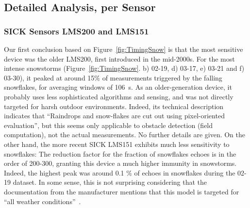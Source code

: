 \subsection{Detailed Analysis, per Sensor}

\subsubsection{SICK Sensors LMS200 and LMS151}
Our first conclusion based on Figure~\ref{fig:TimingSnow} is that the most sensitive device was the older LMS200, first introduced in the mid-2000s. For the most intense snowstorms (Figure~\ref{fig:TimingSnow}. b) 02-19, d) 03-17, e) 03-21 and f) 03-30), it peaked at around 15\% of measurements triggered by the falling snowflakes, for averaging windows of \SI{106}{\second}. As an older-generation device, it probably uses less sophisticated algorithms and sensing, and was not directly targeted for harsh outdoor environments. Indeed, its technical description~\cite{LMS200Manual} indicates that ``Raindrops and snow-flakes are cut out using pixel-oriented evaluation'', but this seems only applicable to obstacle detection (field computation), not the actual measurements. No further details are given. On the other hand, the more recent SICK LMS151 exhibits much less sensitivity to snowflakes: The reduction factor for the fraction of snowflakes echoes is in the order of 200-300, granting this device a much higher immunity in snowstorms. Indeed, the highest peak was around 0.1 \% of echoes in snowflakes during the 02-19 dataset. In some sense, this is not surprising considering that the documentation from the manufacturer mentions that this model is targeted for ``all weather conditions''~\cite{LMS151Manual}.


